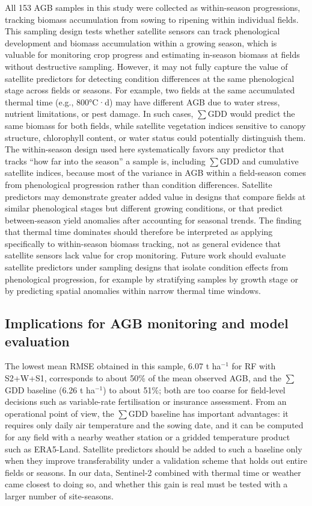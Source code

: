 \documentclass[
  british,
]{interact}
\begin{document}
All 153 AGB samples in this study were collected as within-season
progressions, tracking biomass accumulation from sowing to ripening
within individual fields. This sampling design tests whether satellite
sensors can track phenological development and biomass accumulation
within a growing season, which is valuable for monitoring crop progress
and estimating in-season biomass at fields without destructive sampling.
However, it may not fully capture the value of satellite predictors for
detecting condition differences at the same phenological stage across
fields or seasons. For example, two fields at the same accumulated
thermal time (e.g., 800°C·d) may have different AGB due to water stress,
nutrient limitations, or pest damage. In such cases, \(\sum\)GDD would
predict the same biomass for both fields, while satellite vegetation
indices sensitive to canopy structure, chlorophyll content, or water
status could potentially distinguish them. The within-season design used
here systematically favors any predictor that tracks ``how far into the
season'' a sample is, including \(\sum\)GDD and cumulative satellite
indices, because most of the variance in AGB within a field-season comes
from phenological progression rather than condition differences.
Satellite predictors may demonstrate greater added value in designs that
compare fields at similar phenological stages but different growing
conditions, or that predict between-season yield anomalies after
accounting for seasonal trends. The finding that thermal time dominates
should therefore be interpreted as applying specifically to
within-season biomass tracking, not as general evidence that satellite
sensors lack value for crop monitoring. Future work should evaluate
satellite predictors under sampling designs that isolate condition
effects from phenological progression, for example by stratifying
samples by growth stage or by predicting spatial anomalies within narrow
thermal time windows.

\subsection{Implications for AGB monitoring and model
evaluation}\label{implications-for-agb-monitoring-and-model-evaluation}

The lowest mean RMSE obtained in this sample, 6.07 t ha\(^{-1}\) for RF
with S2+W+S1, corresponds to about 50\% of the mean observed AGB, and
the \(\sum\)GDD baseline (6.26 t ha\(^{-1}\)) to about 51\%; both are
too coarse for field-level decisions such as variable-rate fertilisation
or insurance assessment. From an operational point of view, the
\(\sum\)GDD baseline has important advantages: it requires only daily
air temperature and the sowing date, and it can be computed for any
field with a nearby weather station or a gridded temperature product
such as ERA5-Land. Satellite predictors should be added to such a
baseline only when they improve transferability under a validation
scheme that holds out entire fields or seasons. In our data, Sentinel-2
combined with thermal time or weather came closest to doing so, and
whether this gain is real must be tested with a larger number of
site-seasons.
\end{document}
